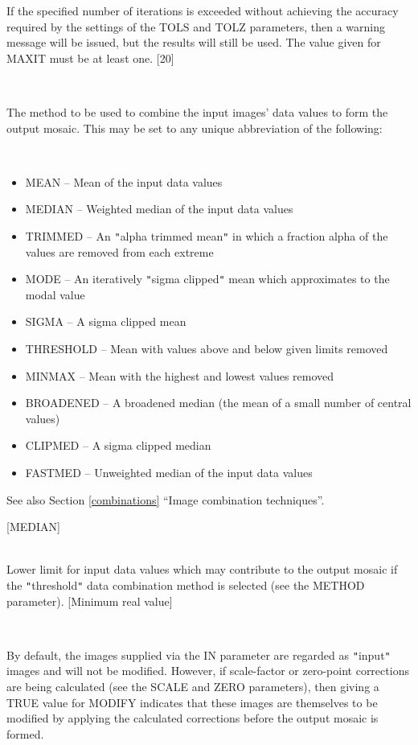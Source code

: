 \documentclass[twoside,11pt]{article}
\newcommand{\htmlref}[2]{#1}
\newcommand{\latexhtml}[2]{#1}
\renewcommand{\_}{\texttt{\symbol{95}}}
\newcommand{\qt}[1]{{\tt "}#1{\tt "}}
\newcommand{\secref}[2]{\latexhtml{Section \ref{#1} ``#2''}{``\htmlref{#2}{#1}''}}
\newcommand{\sstsubsection}[1]{ \item[{#1}] \mbox{} \\}
\newcommand{\sstitemlist}[1]{
  \mbox{} \\
  \vspace{-3.5ex}
  \begin{itemize}
     #1
  \end{itemize}
}
\newcommand{\sstitem}{\item}
\newcommand{\sstsubsection}[1]{\item[{#1}]}
\newcommand{\sstitemlist}[1]{
      \begin{itemize}
         #1
      \end{itemize}
      \\
   }
\newcommand{\sstitem}{\item}
\begin{document}
{{{         If the specified number of iterations is exceeded without
         achieving the accuracy required by the settings of the TOLS
         and TOLZ parameters, then a warning message will be issued,
         but the results will still be used. The value given for MAXIT
         must be at least one.
         [20]
      }
      \sstsubsection{
         METHOD = LITERAL (Read)
      } {
         The method to be used to combine the input images' data values
         to form the output mosaic. This may be set to any unique
         abbreviation of the following:
         \sstitemlist{

            \sstitem
               MEAN      -- Mean of the input data values

            \sstitem
               MEDIAN    -- Weighted median of the input data values

            \sstitem
               TRIMMED   -- An \qt{alpha trimmed mean} in which a fraction
                               alpha of the values are removed from
                               each extreme

            \sstitem
               MODE      -- An iteratively \qt{sigma clipped} mean which
                               approximates to the modal value

            \sstitem
               SIGMA     -- A sigma clipped mean

            \sstitem
               THRESHOLD -- Mean with values above and below given
                               limits removed

            \sstitem
               MINMAX    -- Mean with the highest and lowest values
                               removed

            \sstitem
               BROADENED -- A broadened median (the mean of a small
                               number of central values)
            \sstitem
               CLIPMED   -- A sigma clipped median

            \sstitem
               FASTMED   -- Unweighted median of the input data values
         }
         See also \secref{combinations}{Image combination techniques}.

         [MEDIAN]
      }
      \sstsubsection{
         MIN = \_REAL (Read)
      } {
         Lower limit for input data values which may contribute to the
         output mosaic if the \qt{threshold} data combination method is
         selected (see the METHOD parameter).
         [Minimum real value]
      }
      \sstsubsection{
         MODIFY = \_LOGICAL (Read)
      } {
         By default, the images supplied via the IN parameter are
         regarded as \qt{input} images and will not be modified. However, if
         scale-factor or zero-point corrections are being calculated
         (see the SCALE and ZERO parameters), then giving a TRUE value
         for MODIFY indicates that these images are themselves to be
         modified by applying the calculated corrections before the
         output mosaic is formed.

}}}
\end{document}

